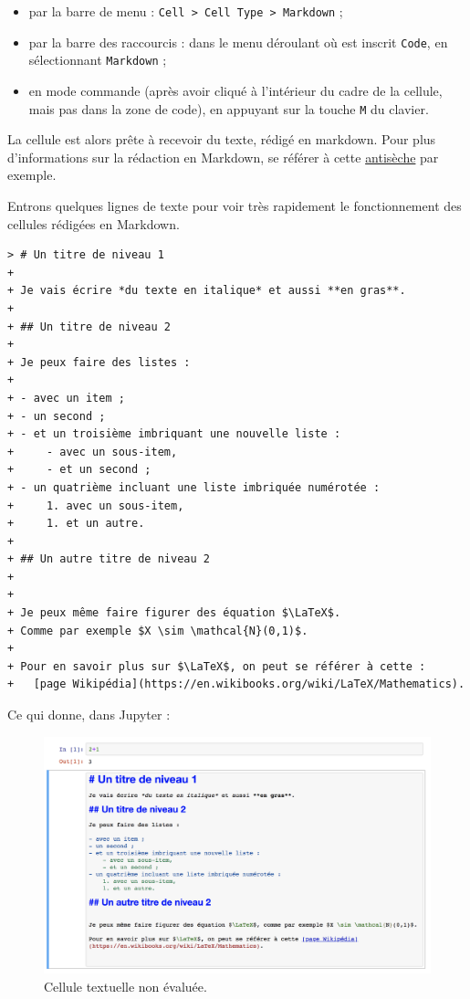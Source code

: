 \documentclass[12pt,]{book}
\providecommand{\tightlist}{%
  \setlength{\itemsep}{0pt}\setlength{\parskip}{0pt}}
\numberwithin{equation}{section}
\numberwithin{countremarque}{section}
\begin{document}
\begin{itemize}
\tightlist
\item
  par la barre de menu :
  \texttt{Cell\ \textgreater{}\ Cell\ Type\ \textgreater{}\ Markdown} ;
\item
  par la barre des raccourcis : dans le menu déroulant où est inscrit
  \texttt{Code}, en sélectionnant \texttt{Markdown} ;
\item
  en mode commande (après avoir cliqué à l'intérieur du cadre de la
  cellule, mais pas dans la zone de code), en appuyant sur la touche
  \texttt{M} du clavier.
\end{itemize}

La cellule est alors prête à recevoir du texte, rédigé en markdown. Pour
plus d'informations sur la rédaction en Markdown, se référer à cette
\href{https://github.com/adam-p/markdown-here/wiki/Markdown-Cheatsheet}{antisèche}
par exemple.

Entrons quelques lignes de texte pour voir très rapidement le
fonctionnement des cellules rédigées en Markdown.

\begin{lstlisting}
> # Un titre de niveau 1
+ 
+ Je vais écrire *du texte en italique* et aussi **en gras**.
+ 
+ ## Un titre de niveau 2
+ 
+ Je peux faire des listes :
+ 
+ - avec un item ;
+ - un second ;
+ - et un troisième imbriquant une nouvelle liste :
+     - avec un sous-item,
+     - et un second ;
+ - un quatrième incluant une liste imbriquée numérotée :
+     1. avec un sous-item,
+     1. et un autre.
+ 
+ ## Un autre titre de niveau 2
+ 
+ 
+ Je peux même faire figurer des équation $\LaTeX$.
+ Comme par exemple $X \sim \mathcal{N}(0,1)$.
+ 
+ Pour en savoir plus sur $\LaTeX$, on peut se référer à cette :
+   [page Wikipédia](https://en.wikibooks.org/wiki/LaTeX/Mathematics).
\end{lstlisting}

Ce qui donne, dans Jupyter :

\begin{figure}[h]

{\centering \includegraphics[width=1\linewidth]{figs/jupyter_notebook_3} 

}

\caption{Cellule textuelle non évaluée.}\label{fig:unnamed-chunk-11}
\end{figure}
\end{document}
